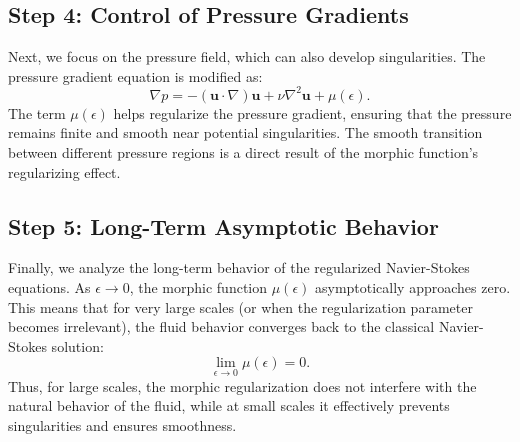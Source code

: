 \documentclass{article}
\begin{document}
\subsection{Step 4: Control of Pressure Gradients}
Next, we focus on the pressure field, which can also develop singularities. The pressure gradient equation is modified as:
\[
\nabla p = -(\mathbf{u} \cdot \nabla) \mathbf{u} + \nu \nabla^2 \mathbf{u} + \mu(\epsilon).
\]
The term \( \mu(\epsilon) \) helps regularize the pressure gradient, ensuring that the pressure remains finite and smooth near potential singularities. The smooth transition between different pressure regions is a direct result of the morphic function’s regularizing effect.

\subsection{Step 5: Long-Term Asymptotic Behavior}
Finally, we analyze the long-term behavior of the regularized Navier-Stokes equations. As \( \epsilon \to 0 \), the morphic function \( \mu(\epsilon) \) asymptotically approaches zero. This means that for very large scales (or when the regularization parameter becomes irrelevant), the fluid behavior converges back to the classical Navier-Stokes solution:
\[
\lim_{\epsilon \to 0} \mu(\epsilon) = 0.
\]
Thus, for large scales, the morphic regularization does not interfere with the natural behavior of the fluid, while at small scales it effectively prevents singularities and ensures smoothness.
\end{document}
